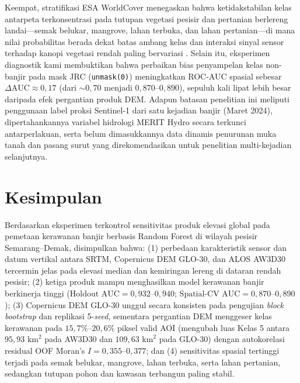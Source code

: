 \documentclass[11pt,twoside]{article}
\begin{document}
Keempat, stratifikasi ESA WorldCover menegaskan bahwa ketidakstabilan kelas antarpeta terkonsentrasi pada tutupan vegetasi pesisir dan pertanian berlereng landai---semak belukar, mangrove, lahan terbuka, dan lahan pertanian---di mana nilai probabilitas berada dekat batas ambang kelas dan interaksi sinyal sensor terhadap kanopi vegetasi rendah paling bervariasi \cite{meadows2024}. Selain itu, eksperimen diagnostik kami membuktikan bahwa perbaikan bias penyampelan kelas non-banjir pada mask JRC (\texttt{unmask(0)}) meningkatkan ROC-AUC spasial sebesar $\Delta\text{AUC} \approx 0{,}17$ (dari $\sim 0{,}70$ menjadi $0{,}870\text{--}0{,}890$), sepuluh kali lipat lebih besar daripada efek pergantian produk DEM. Adapun batasan penelitian ini meliputi penggunaan label proksi Sentinel-1 dari satu kejadian banjir (Maret 2024), dipertahankannya variabel hidrologi MERIT Hydro secara terkunci antarperlakuan, serta belum dimasukkannya data dinamis penurunan muka tanah dan pasang surut \cite{abidin2015,yuwono2024} yang direkomendasikan untuk penelitian multi-kejadian selanjutnya.

\section{Kesimpulan}\label{sec:kesimpulan}

Berdasarkan eksperimen terkontrol sensitivitas produk elevasi global pada pemetaan kerawanan banjir berbasis Random Forest di wilayah pesisir Semarang--Demak, disimpulkan bahwa: (1) perbedaan karakteristik sensor dan datum vertikal antara SRTM, Copernicus DEM GLO-30, dan ALOS AW3D30 tercermin jelas pada elevasi median dan kemiringan lereng di dataran rendah pesisir; (2) ketiga produk mampu menghasilkan model kerawanan banjir berkinerja tinggi ($\text{Holdout AUC} = 0{,}932\text{--}0{,}940$; $\text{Spatial-CV AUC} = 0{,}870\text{--}0{,}890$); (3) Copernicus DEM GLO-30 unggul secara konsisten pada pengujian \textit{block bootstrap} dan replikasi 5-\textit{seed}, sementara pergantian DEM menggeser kelas kerawanan pada $15{,}7\%\text{--}20{,}6\%$ piksel valid AOI (mengubah luas Kelas 5 antara $95{,}93\text{ km}^2$ pada AW3D30 dan $109{,}63\text{ km}^2$ pada GLO-30) dengan autokorelasi residual OOF Moran's $I = 0{,}355\text{--}0{,}377$; dan (4) sensitivitas spasial tertinggi terjadi pada semak belukar, mangrove, lahan terbuka, serta lahan pertanian, sedangkan tutupan pohon dan kawasan terbangun paling stabil.

\end{document}
